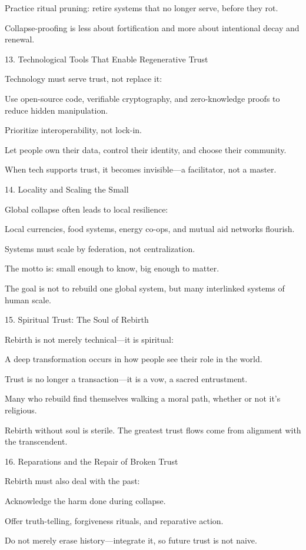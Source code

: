\documentclass[11pt,oneside]{book}
\begin{document}
    Practice ritual pruning: retire systems that no longer serve, before they rot.

Collapse-proofing is less about fortification and more about intentional decay and renewal.

13. Technological Tools That Enable Regenerative Trust


Technology must serve trust, not replace it:

    Use open-source code, verifiable cryptography, and zero-knowledge proofs to reduce hidden manipulation.

    Prioritize interoperability, not lock-in.

    Let people own their data, control their identity, and choose their community.

When tech supports trust, it becomes invisible—a facilitator, not a master.

14. Locality and Scaling the Small


Global collapse often leads to local resilience:

    Local currencies, food systems, energy co-ops, and mutual aid networks flourish.

    Systems must scale by federation, not centralization.

    The motto is: small enough to know, big enough to matter.

The goal is not to rebuild one global system, but many interlinked systems of human scale.

15. Spiritual Trust: The Soul of Rebirth


Rebirth is not merely technical—it is spiritual:

    A deep transformation occurs in how people see their role in the world.

    Trust is no longer a transaction—it is a vow, a sacred entrustment.

    Many who rebuild find themselves walking a moral path, whether or not it’s religious.

Rebirth without soul is sterile. The greatest trust flows come from alignment with the transcendent.

16. Reparations and the Repair of Broken Trust


Rebirth must also deal with the past:

    Acknowledge the harm done during collapse.

    Offer truth-telling, forgiveness rituals, and reparative action.

    Do not merely erase history—integrate it, so future trust is not naive.
\end{document}
